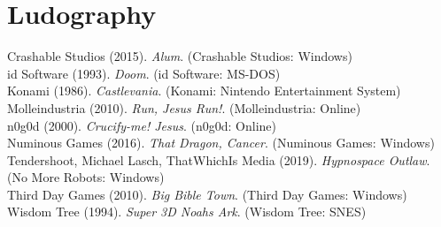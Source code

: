 \section{Ludography}
Crashable Studios (2015). \textit{Alum}. (Crashable Studios: Windows)\\
id Software (1993). \textit{Doom}. (id Software: MS-DOS)\\
Konami (1986). \textit{Castlevania}. (Konami: Nintendo Entertainment System)\\
Molleindustria (2010). \textit{Run, Jesus Run!}. (Molleindustria: Online)\\
n0g0d (2000). \textit{Crucify-me! Jesus}. (n0g0d: Online)\\
Numinous Games (2016). \textit{That Dragon, Cancer}. (Numinous Games: Windows)\\
Tendershoot, Michael Lasch, ThatWhichIs Media (2019). \textit{Hypnospace Outlaw}. (No More Robots: Windows)\\
Third Day Games (2010). \textit{Big Bible Town}. (Third Day Games: Windows)\\
Wisdom Tree (1994). \textit{Super 3D Noah\textquotesingle s Ark}. (Wisdom Tree: SNES)
